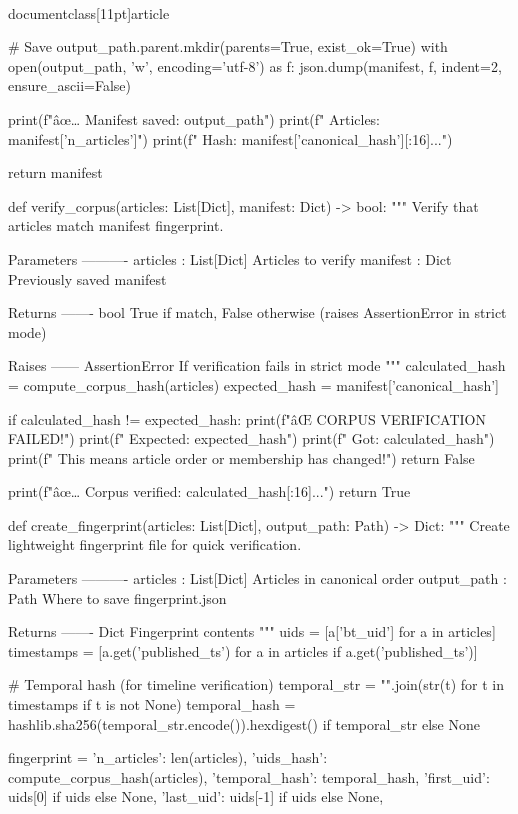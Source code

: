 \\documentclass[11pt]{article}
\begin{document}
\begin{CodeBlock}
    # Save
    output_path.parent.mkdir(parents=True, exist_ok=True)
    with open(output_path, 'w', encoding='utf-8') as f:
        json.dump(manifest, f, indent=2, ensure_ascii=False)
    
    print(f"âœ… Manifest saved: {output_path}")
    print(f"   Articles: {manifest['n_articles']}")
    print(f"   Hash: {manifest['canonical_hash'][:16]}...")
    
    return manifest


def verify_corpus(articles: List[Dict], manifest: Dict) -> bool:
    """
    Verify that articles match manifest fingerprint.
    
    Parameters
    ----------
    articles : List[Dict]
        Articles to verify
    manifest : Dict
        Previously saved manifest
    
    Returns
    -------
    bool
        True if match, False otherwise (raises AssertionError in strict mode)
    
    Raises
    ------
    AssertionError
        If verification fails in strict mode
    """
    calculated_hash = compute_corpus_hash(articles)
    expected_hash = manifest['canonical_hash']
    
    if calculated_hash != expected_hash:
        print(f"âŒ CORPUS VERIFICATION FAILED!")
        print(f"   Expected: {expected_hash}")
        print(f"   Got:      {calculated_hash}")
        print(f"   This means article order or membership has changed!")
        return False
    
    print(f"âœ… Corpus verified: {calculated_hash[:16]}...")
    return True


def create_fingerprint(articles: List[Dict], output_path: Path) -> Dict:
    """
    Create lightweight fingerprint file for quick verification.
    
    Parameters
    ----------
    articles : List[Dict]
        Articles in canonical order
    output_path : Path
        Where to save fingerprint.json
    
    Returns
    -------
    Dict
        Fingerprint contents
    """
    uids = [a['bt_uid'] for a in articles]
    timestamps = [a.get('published_ts') for a in articles if a.get('published_ts')]
    
    # Temporal hash (for timeline verification)
    temporal_str = "".join(str(t) for t in timestamps if t is not None)
    temporal_hash = hashlib.sha256(temporal_str.encode()).hexdigest() if temporal_str else None
    
    fingerprint = {
        'n_articles': len(articles),
        'uids_hash': compute_corpus_hash(articles),
        'temporal_hash': temporal_hash,
        'first_uid': uids[0] if uids else None,
        'last_uid': uids[-1] if uids else None,
    }
    

\end{CodeBlock}
\end{document}
